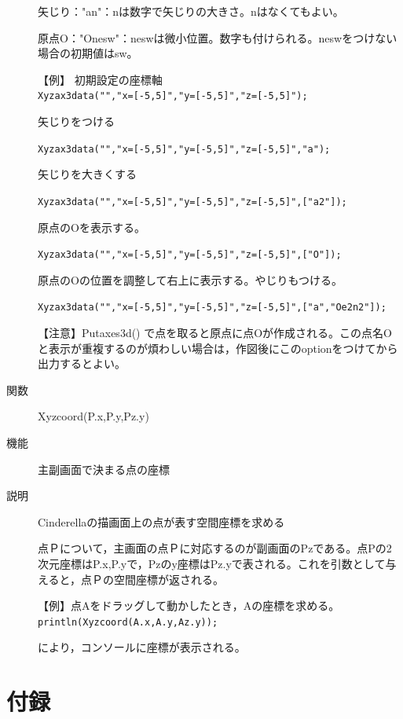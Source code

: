\documentclass[papersize,a4paper,12pt,uplatex]{jsarticle}
\begin{document}
\begin{description}
矢じり："an"：nは数字で矢じりの大きさ。nはなくてもよい。

原点O："Onesw"：neswは微小位置。数字も付けられる。neswをつけない場合の初期値はsw。

【例】 初期設定の座標軸\\
\verb|Xyzax3data("","x=[-5,5]","y=[-5,5]","z=[-5,5]");|
        
 矢じりをつける
 
 \verb|Xyzax3data("","x=[-5,5]","y=[-5,5]","z=[-5,5]","a");|
 
 矢じりを大きくする
 
 \verb|Xyzax3data("","x=[-5,5]","y=[-5,5]","z=[-5,5]",["a2"]);|
  
原点のOを表示する。

 \verb|Xyzax3data("","x=[-5,5]","y=[-5,5]","z=[-5,5]",["O"]);|
 
 原点のOの位置を調整して右上に表示する。やじりもつける。
 
 \verb|Xyzax3data("","x=[-5,5]","y=[-5,5]","z=[-5,5]",["a","Oe2n2"]);|
 

【注意】Putaxes3d() で点を取ると原点に点Oが作成される。この点名Oと表示が重複するのが煩わしい場合は，作図後にこのoptionをつけてから出力するとよい。


\vspace{\baselineskip}
\hypertarget{xyzcoord}{}
\item[関数]  Xyzcoord(P.x,P.y,Pz.y)
\item[機能]  主副画面で決まる点の座標
\item[説明]  Cinderellaの描画面上の点が表す空間座標を求める

  点Ｐについて，主画面の点Ｐに対応するのが副画面のPzである。点Pの2次元座標はP.x,P.yで，Pzのy座標はPz.yで表される。これを引数として与えると，点Ｐの空間座標が返される。
  
\vspace{\baselineskip}
【例】点Aをドラッグして動かしたとき，Aの座標を求める。
\verb|println(Xyzcoord(A.x,A.y,Az.y));|
  
により，コンソールに座標が表示される。

\end{description}
\newpage

\section{付録}
\end{document}
